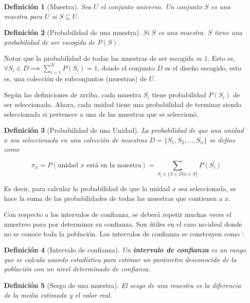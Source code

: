 \documentclass{report}
\newtheorem{definition}{Definición}
\begin{document}
\begin{definition}[Muestra]
    Sea $U$ el conjunto universo. Un conjunto $S$ es una muestra para $U$ si $S \subseteq U$.
\end{definition}

\begin{definition}[Probabilidad de una muestra]
    Si $S$ es una muestra. $S$ tiene una probabilidad de ser escogida de $P(S)$.
\end{definition}

Notar que la probabilidad de todas las muestras de ser escogida es $1$. Esto es, $\forall S_i \in D \implies \sum_{i=1}^{N} P(S_i) = 1$, donde el conjunto $D$ es el diseño escogido, esto es, una colección de subconjuntos (muestras) de $U$.

\bigbreak

Según las definiciones de arriba, cada muestra $S_i$ tiene probabilidad $P(S_i)$ de ser seleccionada. Ahora, cada unidad tiene una probabilidad de terminar siendo seleccionada si pertenece a una de las muestras que se seleccionó.

\begin{definition}[Probabilidad de una Unidad]
    La probabilidad de que una unidad $x$ sea seleccionada en una colección de muestras $D = \{ S_1, S_2, ..., S_n \}$ se define como
    
    $$
    \pi_x = P(\text{unidad $x$ está en la muestra}) = \sum_{S_i \in \{ S \in D | x \in S \}} P(S_i)
    $$
\end{definition}

Es decir, para calcular la probabilidad de que la unidad $x$ sea seleccionada, se hace la suma de las probabilidades de todas las muestras que contienen a $x$.

Con respecto a los intervalos de confianza, se deberá repetir muchas veces el muestreo para por determinar su confianza. Son útiles en el caso no-ideal donde no se conoce toda la población. Los intervalos de confianza se construyen como \cite{the-pennsylvania-state-university-no-date}:

\begin{definition}[Intervalo de confianza]
    Un \textbf{intervalo de confianza} es un rango que se calcula usando estadística para estimar un parámetro desconocido de la población con un nivel determinado de confianza. 
\end{definition}

\begin{definition}[Sesgo de una muestra]
    El sesgo de una muestra es la diferencia de la media estimada y el valor real.
\end{definition}
\end{document}
